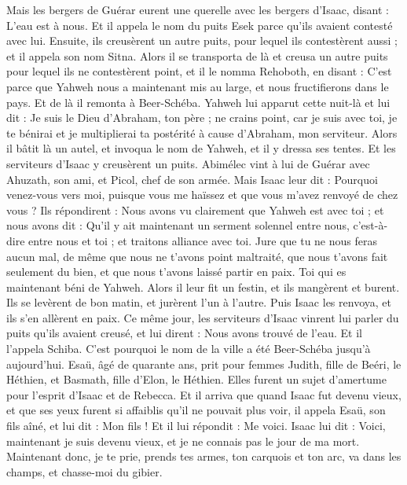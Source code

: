 \begin{multicols}{2}
Mais les bergers de Guérar eurent une querelle avec les bergers d'Isaac, disant : L'eau est à nous. Et il appela le nom du puits Esek parce qu'ils avaient contesté avec lui.
Ensuite, ils creusèrent un autre puits, pour lequel ils contestèrent aussi ; et il appela son nom Sitna.
Alors il se transporta de là et creusa un autre puits pour lequel ils ne contestèrent point, et il le nomma Rehoboth, en disant : C'est parce que Yahweh nous a maintenant mis au large, et nous fructifierons dans le pays.
Et de là il remonta à Beer-Schéba.
Yahweh lui apparut cette nuit-là et lui dit : Je suis le Dieu d'Abraham, ton père ; ne crains point, car je suis avec toi, je te bénirai et je multiplierai ta postérité à cause d'Abraham, mon serviteur.
Alors il bâtit là un autel, et invoqua le nom de Yahweh, et il y dressa ses tentes. Et les serviteurs d'Isaac y creusèrent un puits.
Abimélec vint à lui de Guérar avec Ahuzath, son ami, et Picol, chef de son armée.
Mais Isaac leur dit : Pourquoi venez-vous vers moi, puisque vous me haïssez et que vous m'avez renvoyé de chez vous ?
Ils répondirent : Nous avons vu clairement que Yahweh est avec toi ; et nous avons dit : Qu'il y ait maintenant un serment solennel entre nous, c'est-à-dire entre nous et toi ; et traitons alliance avec toi.
Jure que tu ne nous feras aucun mal, de même que nous ne t'avons point maltraité, que nous t'avons fait seulement du bien, et que nous t’avons laissé partir en paix. Toi qui es maintenant béni de Yahweh.
Alors il leur fit un festin, et ils mangèrent et burent.
Ils se levèrent de bon matin, et jurèrent l'un à l'autre. Puis Isaac les renvoya, et ils s'en allèrent en paix.
Ce même jour, les serviteurs d'Isaac vinrent lui parler du puits qu'ils avaient creusé, et lui dirent : Nous avons trouvé de l'eau.
Et il l'appela Schiba. C'est pourquoi le nom de la ville a été Beer-Schéba jusqu'à aujourd'hui.
Esaü, âgé de quarante ans, prit pour femmes Judith, fille de Beéri, le Héthien, et Basmath, fille d'Elon, le Héthien.
Elles furent un sujet d’amertume pour l’esprit d’Isaac et de Rebecca.
\VerseOne{}Et il arriva que quand Isaac fut devenu vieux, et que ses yeux furent si affaiblis qu'il ne pouvait plus voir, il appela Esaü, son fils aîné, et lui dit : Mon fils ! Et il lui répondit : Me voici.
Isaac lui dit : Voici, maintenant je suis devenu vieux, et je ne connais pas le jour de ma mort.
Maintenant donc, je te prie, prends tes armes, ton carquois et ton arc, va dans les champs, et chasse-moi du gibier.

\end{multicols}
